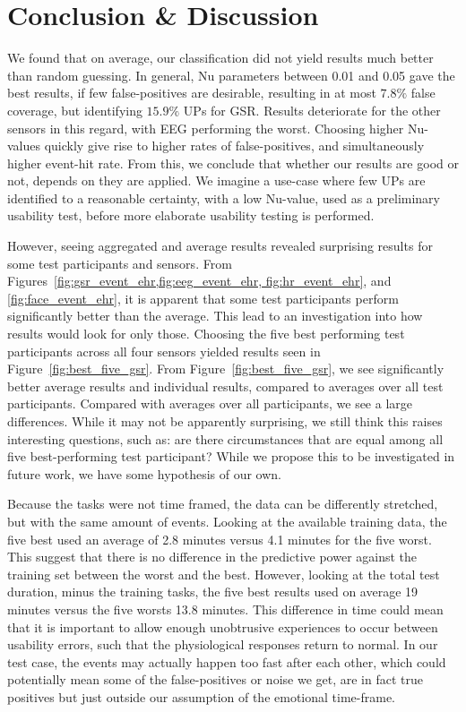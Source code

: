\section{Conclusion \& Discussion}
We found that on average, our classification did not yield results much better than random guessing. In general, Nu
parameters between 0.01 and 0.05 gave the best results, if few false-positives are desirable, resulting in at most
$7.8\%$ false coverage, but identifying $15.9\%$ UPs for GSR. Results deteriorate for the other sensors in this regard,
with EEG performing the worst. Choosing higher Nu-values quickly give rise to higher rates of false-positives, and
simultaneously higher event-hit rate. From this, we conclude that whether our results are good or not, depends on they
are applied. We imagine a use-case where few UPs are identified to a reasonable certainty, with a low Nu-value, used as
a preliminary usability test, before more elaborate usability testing is performed.

However, seeing aggregated and average results revealed surprising results for some test participants and sensors. From
Figures~\ref{fig:gsr_event_ehr,fig:eeg_event_ehr, fig:hr_event_ehr}, and \ref{fig:face_event_ehr}, it is apparent that
some test participants perform significantly better than the average. This lead to an investigation into how results
would look for only those. Choosing the five best performing test participants across all four sensors yielded results
seen in Figure~\ref{fig:best_five_gsr}. From Figure~\ref{fig:best_five_gsr}, we see significantly better average results
and individual results, compared to averages over all test participants. Compared with averages over all participants,
we see a large differences. While it may not be apparently surprising, we still think this raises interesting questions,
such as: are there circumstances that are equal among all five best-performing test participant? While we propose this
to be investigated in future work, we have some hypothesis of our own.

Because the tasks were not time framed, the data can be differently stretched, but with the same amount of
events. Looking at the available training data, the five best used an average of 2.8 minutes versus 4.1 minutes for the
five worst. This suggest that there is no difference in the predictive power against the training set between the worst
and the best. However, looking at the total test duration, minus the training tasks, the five best results used on
average 19 minutes versus the five worsts 13.8 minutes. This difference in time could mean that it is important to allow
enough unobtrusive experiences to occur between usability errors, such that the physiological responses return to
normal. In our test case, the events may actually happen too fast after each other, which could potentially mean some of
the false-positives or noise we get, are in fact true positives but just outside our assumption of the emotional
time-frame.

